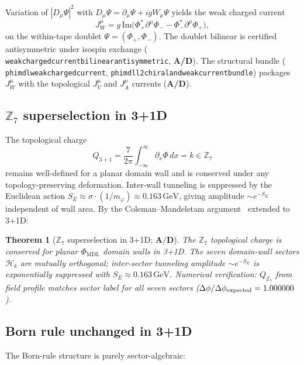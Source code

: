 \documentclass[11pt]{article}
\newtheorem{theorem}{Theorem}[section]
\theoremstyle{remark}
\newcommand{\PHIMDL}{\Phi_{\mathrm{MDL}}}
\newcommand{\ZS}{\mathbb{Z}_7}
\newcommand{\lean}[1]{%
  \penalty-100
  \begingroup\def\_{\textunderscore\allowbreak}\texttt{#1}\endgroup}
\newcommand{\CatAD}{\textbf{A/D}}
\begin{document}
Variation of $|D_\mu\Psi|^2$ with $D_\mu\Psi = \partial_\mu\Psi + igW_\mu\Psi$ yields
the weak charged current
\begin{equation}
  J^\mu_W = g\,\mathrm{Im}\!\bigl(\Phi_+^*\partial^\mu\Phi_- - \Phi_-^*\partial^\mu\Phi_+\bigr),
  \label{eq:jw_charged}
\end{equation}
on the within-tape doublet $\Psi=(\Phi_+,\Phi_-)$.
The doublet bilinear is certified antisymmetric under isospin exchange
(\lean{weak\_charged\_current\_bilinear\_antisymmetric}, \CatAD).
The structural bundle
(\lean{phimdl\_weak\_charged\_current}, \lean{phimdl\_l2\_chiral\_and\_weak\_current\_bundle})
packages $J^\mu_W$ with the topological $J^\mu_V$ and $J^\mu_A$ currents
(\CatAD{}).

\subsection{$\ZS$ superselection in 3+1D}
\label{ssec:3d_supersel}

The topological charge
\begin{equation}
  Q_{3+1} = \frac{7}{2\pi}\int_{-\infty}^{\infty}\partial_x\Phi\,dx = k \in \ZS
\end{equation}
remains well-defined for a planar domain wall and is conserved under any
topology-preserving deformation.  Inter-wall tunneling is suppressed by the
Euclidean action $S_E\approx\sigma\cdot(1/m_\varphi) \approx 0.163\,\mathrm{GeV}$,
giving amplitude $\sim e^{-S_E}$ independent of wall area.  By the
Coleman--Mandelstam argument~\cite{Coleman1975,Mandelstam1975} extended to 3+1D:

\begin{theorem}[$\ZS$ superselection in 3+1D; $\CatAD$]
  \label{thm:3d_supersel}
  The $\ZS$ topological charge is conserved for planar $\PHIMDL$ domain walls
  in 3+1D.  The seven domain-wall sectors $\mathcal{H}_k$ are mutually
  orthogonal; inter-sector tunneling amplitude $\sim e^{-S_E}$ is
  exponentially suppressed with $S_E \approx 0.163\,\mathrm{GeV}$.
  Numerical verification: $Q_{\ZS}$ from field profile matches sector label for
  all seven sectors ($\Delta\phi/\Delta\phi_{\rm expected} = 1.000000$).
\end{theorem}

\subsection{Born rule unchanged in 3+1D}
\label{ssec:3d_born}

The Born-rule structure is purely sector-algebraic:
\end{document}

